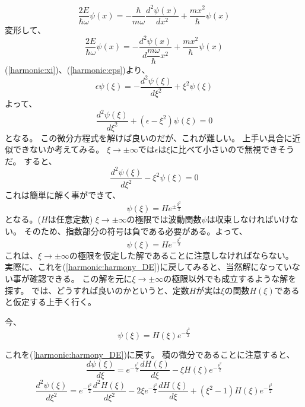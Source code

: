\begin{equation}
  \dfrac{2E}{\hbar\omega}\psi(x) = - \dfrac{\hbar}{m\omega} \dfrac{d^2 \psi(x)}{d x^2} + \dfrac{mx^2}{\hbar} \psi(x)
\end{equation}
変形して、
\begin{equation}
  \dfrac{2E}{\hbar\omega}\psi(x) = - \dfrac{d^2 \psi(x)}{d \dfrac{m\omega}{\hbar} x^2} + \dfrac{mx^2}{\hbar} \psi(x)
\end{equation}
(\ref{harmonic:xi})、(\ref{harmonic:eps})より、
\begin{equation}
  \epsilon\psi(\xi) = - \dfrac{d^2 \psi(\xi)}{d \xi^2} + \xi^2\psi(\xi)
\end{equation}
よって、
\begin{equation}
  \label{harmonic:harmony_DE}
  \dfrac{d^2 \psi(\xi)}{d \xi^2} + (\epsilon - \xi^2)\psi(\xi) = 0
\end{equation}
となる。
この微分方程式を解けば良いのだが、これが難しい。
上手い具合に近似できないか考えてみる。
$\xi \to \pm \infty$では$\epsilon$は$\xi$に比べて小さいので無視できそうだ。
すると、
\begin{equation}
  \dfrac{d^2 \psi(\xi)}{d \xi^2}  - \xi^2\psi(\xi) = 0
\end{equation}
これは簡単に解く事ができて、
\begin{equation}
  \psi(\xi) = He^{\pm \frac{\xi^2}{2}}
\end{equation}
となる。($H$は任意定数)
$\xi \to \pm\infty$の極限では波動関数$\psi$は収束しなければいけない。
そのため、指数部分の符号は負である必要がある。よって、
\begin{equation}
  \psi(\xi) = He^{-\frac{\xi^2}{2}}
\end{equation}
これは、$\xi \to \pm \infty$の極限を仮定した解であることに注意しなければならない。
実際に、これを(\ref{harmonic:harmony_DE})に戻してみると、当然解になっていない事が確認できる。
この解を元に$\xi \to \pm \infty$の極限以外でも成立するような解を探す。
では、どうすれば良いのかというと、定数$H$が実は$\xi$の関数$H(\xi)$であると仮定する上手く行く。

今、
\begin{equation}
  \psi(\xi) = H(\xi)e^{-\frac{\xi^2}{2}}
\end{equation}

これを(\ref{harmonic:harmony_DE})に戻す。
積の微分であることに注意すると、
\begin{equation}
  \dfrac{d\psi(\xi)}{d\xi} = e^{-\frac{\xi^2}{2}}\dfrac{dH(\xi)}{d\xi} - \xi H(\xi)e^{-\frac{\xi^2}{2}}
\end{equation}
\begin{equation}
  \dfrac{d^2\psi(\xi)}{d\xi^2} = e^{-\frac{\xi^2}{2}}\dfrac{d^2 H(\xi)}{d\xi^2} -2\xi e^{-\frac{\xi^2}{2}}\dfrac{dH(\xi)}{d\xi}
  + (\xi^2 - 1)H(\xi)e^{-\frac{\xi^2}{2}}
\end{equation}

